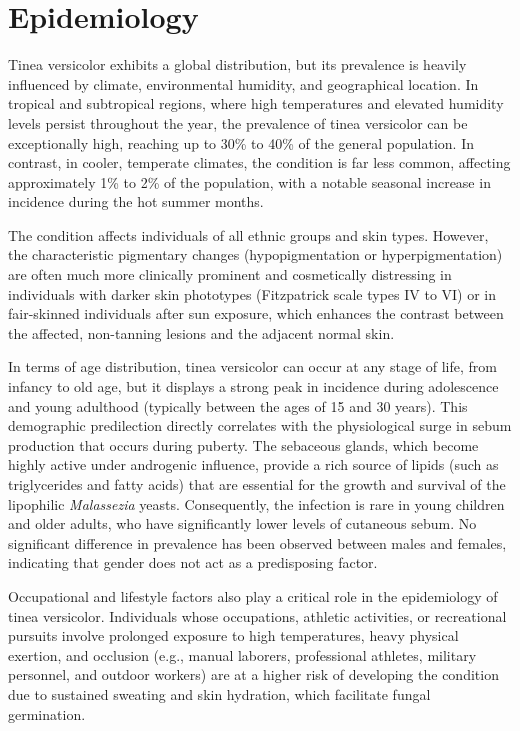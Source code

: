 \section*{Epidemiology}
Tinea versicolor exhibits a global distribution, but its prevalence is heavily influenced by climate, environmental humidity, and geographical location. In tropical and subtropical regions, where high temperatures and elevated humidity levels persist throughout the year, the prevalence of tinea versicolor can be exceptionally high, reaching up to 30\% to 40\% of the general population. In contrast, in cooler, temperate climates, the condition is far less common, affecting approximately 1\% to 2\% of the population, with a notable seasonal increase in incidence during the hot summer months.

The condition affects individuals of all ethnic groups and skin types. However, the characteristic pigmentary changes (hypopigmentation or hyperpigmentation) are often much more clinically prominent and cosmetically distressing in individuals with darker skin phototypes (Fitzpatrick scale types IV to VI) or in fair-skinned individuals after sun exposure, which enhances the contrast between the affected, non-tanning lesions and the adjacent normal skin.

In terms of age distribution, tinea versicolor can occur at any stage of life, from infancy to old age, but it displays a strong peak in incidence during adolescence and young adulthood (typically between the ages of 15 and 30 years). This demographic predilection directly correlates with the physiological surge in sebum production that occurs during puberty. The sebaceous glands, which become highly active under androgenic influence, provide a rich source of lipids (such as triglycerides and fatty acids) that are essential for the growth and survival of the lipophilic \textit{Malassezia} yeasts. Consequently, the infection is rare in young children and older adults, who have significantly lower levels of cutaneous sebum. No significant difference in prevalence has been observed between males and females, indicating that gender does not act as a predisposing factor.

Occupational and lifestyle factors also play a critical role in the epidemiology of tinea versicolor. Individuals whose occupations, athletic activities, or recreational pursuits involve prolonged exposure to high temperatures, heavy physical exertion, and occlusion (e.g., manual laborers, professional athletes, military personnel, and outdoor workers) are at a higher risk of developing the condition due to sustained sweating and skin hydration, which facilitate fungal germination.

